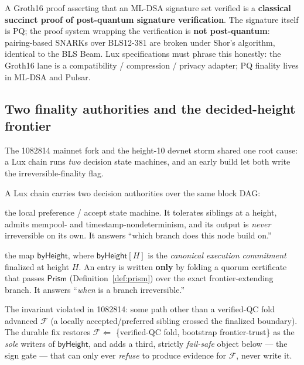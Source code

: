 \begin{remark}
\label{rem:groth16-not-pq}
A Groth16 proof asserting that an ML-DSA signature set verified is a
\textbf{classical succinct proof of post-quantum signature verification}.
The signature itself is PQ; the proof system wrapping the verification
is \textbf{not post-quantum}: pairing-based SNARKs over BLS12-381 are
broken under Shor's algorithm, identical to the BLS Beam. Lux
specifications must phrase this honestly: the Groth16 lane is a
compatibility / compression / privacy adapter; PQ finality lives in
ML-DSA and Pulsar.
\end{remark}


\subsection*{Two finality authorities and the decided-height frontier}

The 1082814 mainnet fork and the height-10 devnet storm shared one
root cause: a Lux chain runs \emph{two} decision state machines, and an
early build let both write the irreversible-finality flag.

\begin{definition}
\label{def:two-authorities}
A Lux chain carries two decision authorities over the same block DAG:
\begin{description}[nosep,leftmargin=2em]
  \item[Acceptance $\mathcal{A}$ (Nova / Snowman-style):] the local
        preference / accept state machine. It tolerates siblings at a
        height, admits mempool- and timestamp-nondeterminism, and its
        output is \emph{never} irreversible on its own. It answers
        ``which branch does this node build on.''
  \item[Certified finality $\mathcal{F}$ (Quasar):] the map
        $\mathsf{byHeight}$, where $\mathsf{byHeight}[H]$ is the
        \emph{canonical execution commitment} finalized at height $H$.
        An entry is written \textbf{only} by folding a quorum
        certificate that passes $\mathsf{Prism}$
        (Definition~\ref{def:prism}) over the exact frontier-extending
        branch. It answers ``\emph{when} is a branch irreversible.''
\end{description}
The invariant violated in 1082814: some path other than a verified-QC
fold advanced $\mathcal{F}$ (a locally accepted/preferred sibling
crossed the finalized boundary). The durable fix restores
$\mathcal{F} \Leftarrow$ \{verified-QC fold, bootstrap frontier-trust\}
as the \emph{sole} writers of $\mathsf{byHeight}$, and adds a third,
strictly \emph{fail-safe} object below --- the sign gate --- that can
only ever \emph{refuse} to produce evidence for $\mathcal{F}$, never
write it.
\end{definition}

